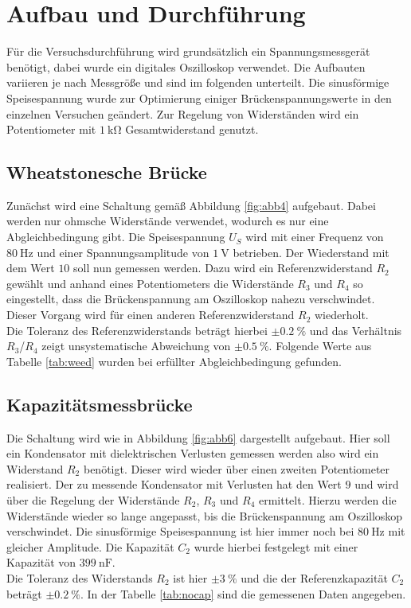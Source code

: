 \section{Aufbau und Durchführung}

Für die Versuchsdurchführung wird grundsätzlich ein Spannungsmessgerät benötigt, dabei wurde ein digitales Oszilloskop verwendet. Die Aufbauten variieren je nach Messgröße und sind
im folgenden unterteilt. Die sinusförmige Speisespannung wurde zur Optimierung einiger Brückenspannungswerte in den einzelnen Versuchen geändert. Zur Regelung von Widerständen wird ein Potentiometer mit $\SI{1}{\kilo\ohm}$ Gesamtwiderstand 
genutzt.

\subsection{Wheatstonesche Brücke}
\label{sec:weedyo}
Zunächst wird eine Schaltung gemäß Abbildung \ref{fig:abb4} aufgebaut. Dabei werden nur ohmsche Widerstände verwendet, wodurch es nur eine Abgleichbedingung gibt. Die Speisespannung $U_{S}$ wird mit einer Frequenz von
$\SI{80}{\hertz}$ und einer Spannungsamplitude von $\SI{1}{\volt}$ betrieben. Der Wiederstand mit dem Wert $10$ soll nun gemessen werden. Dazu wird ein Referenzwiderstand $R_{2}$ gewählt und anhand eines Potentiometers die Widerstände 
$R_{3}$ und $R_{4}$ so eingestellt, dass die Brückenspannung am Oszilloskop nahezu verschwindet. Dieser Vorgang wird für einen anderen Referenzwiderstand $R_{2}$ wiederholt. 
\\
\newline
Die Toleranz des Referenzwiderstands beträgt hierbei $\pm\SI{0.2}{\percent}$ und das Verhältnis $R_{3}$/$R_{4}$ zeigt unsystematische Abweichung von $\pm\SI{0.5}{\percent}$.
Folgende Werte aus Tabelle \ref{tab:weed} wurden bei erfüllter Abgleichbedingung gefunden.

\subsection{Kapazitätsmessbrücke}
\label{sec:nocapyo}
Die Schaltung wird wie in Abbildung \ref{fig:abb6} dargestellt aufgebaut. Hier soll ein Kondensator mit dielektrischen Verlusten gemessen werden also wird ein Widerstand $R_{2}$ benötigt. Dieser wird wieder über einen
zweiten Potentiometer realisiert. Der zu messende Kondensator mit 
Verlusten hat den Wert $9$ und wird über die Regelung der Widerstände $R_{2}$, $R_{3}$ und $R_{4}$ ermittelt. Hierzu werden die Widerstände wieder so lange angepasst, bis die Brückenspannung am Oszilloskop verschwindet.
Die sinusförmige Speisespannung ist hier immer noch bei $\SI{80}{\hertz}$ mit gleicher Amplitude. Die Kapazität $C_{2}$ wurde hierbei festgelegt mit einer Kapazität von $\SI{399}{\nano\farad}$.
\\
\newline
Die Toleranz des Widerstands $R_{2}$ ist hier $\pm\SI{3}{\percent}$ und die der Referenzkapazität $C_{2}$ beträgt $\pm\SI{0.2}{\percent}$.
In der Tabelle \ref{tab:nocap} sind die gemessenen Daten angegeben.

